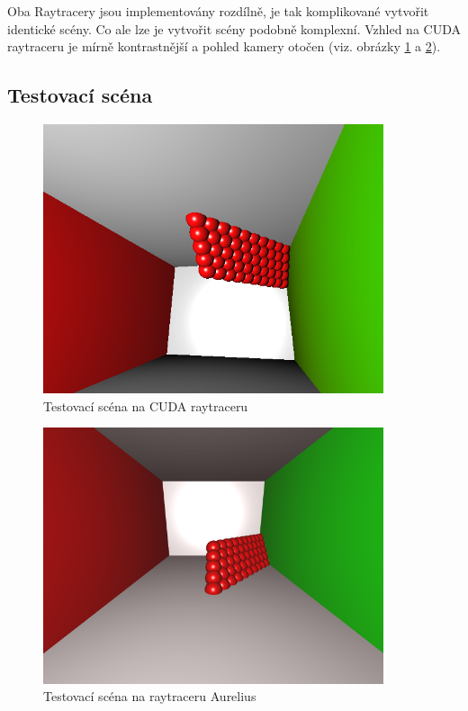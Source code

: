 \documentclass[12pt,a4paper,titlepage,final]{report}
\begin{document}
Oba Raytracery jsou implementovány rozdílně, je tak komplikované vytvořit identické scény. Co ale lze je vytvořit scény podobně komplexní. Vzhled na CUDA raytraceru je mírně kontrastnější a pohled kamery otočen (viz. obrázky \ref{fig:sc-cuda} a \ref{fig:sc-aur}).

\subsection{Testovací scéna}

\begin{figure}
\begin{center}
\includegraphics[width=10cm]{images/test-scene.png}
\caption{Testovací scéna na CUDA raytraceru}
\label{fig:sc-cuda}
\end{center}
\end{figure}

\begin{figure}
\begin{center}
\includegraphics[width=10cm]{images/test-scene-aurelius.png}
\caption{Testovací scéna na raytraceru Aurelius}
\label{fig:sc-aur}
\end{center}
\end{figure}
\end{document}
